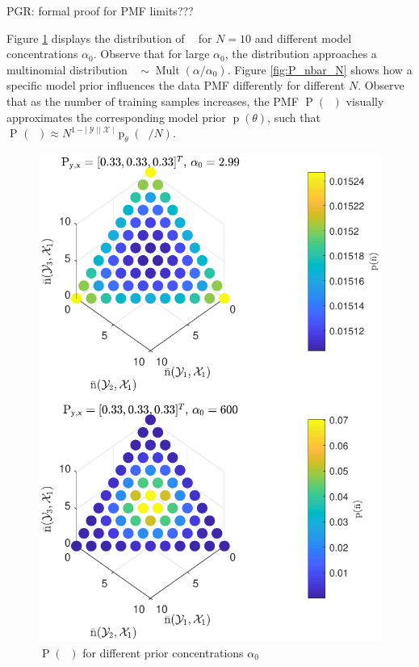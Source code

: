 \documentclass[12pt]{report}
\DeclareMathOperator{\nbarrm}{\bar{\mathrm{n}}}
\DeclareMathOperator{\Prm}{\mathrm{P}}
\DeclareMathOperator{\prm}{\mathrm{p}}
\DeclareMathOperator{\Xcal}{\mathcal{X}}
\DeclareMathOperator{\Ycal}{\mathcal{Y}}
\DeclareMathOperator{\Mult}{\mathrm{Mult}}
\begin{document}
PGR: formal proof for PMF limits???

Figure \ref{fig:P_nbar_a0} displays the distribution of $\nbarrm$ for $N=10$ and different model concentrations $\alpha_0$. Observe that for large $\alpha_0$, the distribution approaches a multinomial distribution $\nbarrm \sim \Mult(\alpha/\alpha_0)$. Figure \ref{fig:P_nbar_N} shows how a specific model prior influences the data PMF differently for different $N$. Observe that as the number of training samples increases, the PMF $\Prm(\nbarrm)$ visually approximates the corresponding model prior $\prm(\theta)$, such that $\Prm_{\nbarrm}(\nbarrm) \approx N^{1-|\Ycal||\Xcal|}\prm_{\theta}(\nbarrm/N)$.

\begin{figure}
\centering
\includegraphics[scale=1.0]{P_nbar_a0.pdf}
\caption{$\Prm(\nbarrm)$ for different prior concentrations $\alpha_0$}
\label{fig:P_nbar_a0}
\end{figure}
\end{document}
